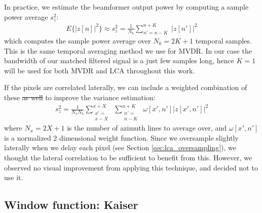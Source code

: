 \documentclass[10pt,journal,draftclsnofoot,onecolumn]{IEEEtran}
\newcommand\nmat[1]{\begin{matrix}#1\end{matrix}}
\newcommand\sumb[2]{\sum\limits_{#1}^{#2}\;}
\newcommand\1{\vec 1}
\providecommand{\DIFdel}[1]{{\protect\color{red}\sout{#1}}}                      %
\providecommand{\DIFdelbegin}{} %
\providecommand{\DIFdelend}{} %
\begin{document}
In practice, we estimate the beamformer output power by computing a sample power average $s_z^2$:
%
\begin{align*}
E\big\{\big|z[n]\big|^2\big\} \approx s_z^2 = \frac{1}{N_k} \sumb{n'=n-K}{n+K} \big| z[n'] \big|^2
\end{align*}
%
which computes the sample power average over $N_k=2K+1$ temporal samples. This is the same temporal averaging method we use for MVDR. In our case the bandwidth of our matched filtered signal is a just few samples long, hence $K=1$ will be used for both MVDR and LCA throughout this work.

If the pixels are correlated laterally, we can include a weighted combination of these \DIFdelbegin \DIFdel{as well }\DIFdelend to improve the variance estimation:
%
\begin{align}
s_z^2 = \frac{1}{N_x N_k} \sumb{\nmat{\scriptstyle x'=\\[-2mm]\scriptstyle x-X}}{x+X} \sumb{\nmat{\scriptstyle n'=\\[-2mm]\scriptstyle n-K}}{n+K} \omega[x',n']\big| z[x',n'] \big|^2
\end{align}
%
where $N_x = 2X+1$ is the number of azimuth lines to average over, and $\omega[x',n']$ is a normalized 2 dimensional weight function. Since we oversample slightly laterally when we delay each pixel (see Section \ref{sec:lca_oversampling}), we thought the lateral correlation to be sufficient to benefit from this. However, we observed no visual improvement from applying this technique, and decided not to use it.
% 


\subsection{Window function: Kaiser}\label{sec:lca_kaiser_windows}
\end{document}
